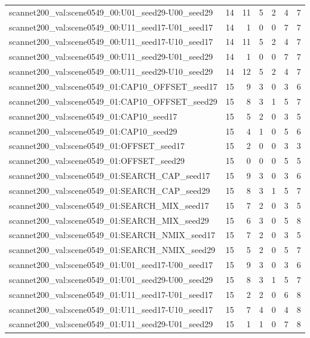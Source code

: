\begin{table}[t]
\begin{tabular}{lrrrrrr}
scannet200\_val:scene0549\_00:U01\_seed29-U00\_seed29 & 14 & 11 & 5 & 2 & 4 & 7 \\
scannet200\_val:scene0549\_00:U11\_seed17-U01\_seed17 & 14 & 1 & 0 & 0 & 7 & 7 \\
scannet200\_val:scene0549\_00:U11\_seed17-U10\_seed17 & 14 & 11 & 5 & 2 & 4 & 7 \\
scannet200\_val:scene0549\_00:U11\_seed29-U01\_seed29 & 14 & 1 & 0 & 0 & 7 & 7 \\
scannet200\_val:scene0549\_00:U11\_seed29-U10\_seed29 & 14 & 12 & 5 & 2 & 4 & 7 \\
scannet200\_val:scene0549\_01:CAP10\_OFFSET\_seed17 & 15 & 9 & 3 & 0 & 3 & 6 \\
scannet200\_val:scene0549\_01:CAP10\_OFFSET\_seed29 & 15 & 8 & 3 & 1 & 5 & 7 \\
scannet200\_val:scene0549\_01:CAP10\_seed17 & 15 & 5 & 2 & 0 & 3 & 5 \\
scannet200\_val:scene0549\_01:CAP10\_seed29 & 15 & 4 & 1 & 0 & 5 & 6 \\
scannet200\_val:scene0549\_01:OFFSET\_seed17 & 15 & 2 & 0 & 0 & 3 & 3 \\
scannet200\_val:scene0549\_01:OFFSET\_seed29 & 15 & 0 & 0 & 0 & 5 & 5 \\
scannet200\_val:scene0549\_01:SEARCH\_CAP\_seed17 & 15 & 9 & 3 & 0 & 3 & 6 \\
scannet200\_val:scene0549\_01:SEARCH\_CAP\_seed29 & 15 & 8 & 3 & 1 & 5 & 7 \\
scannet200\_val:scene0549\_01:SEARCH\_MIX\_seed17 & 15 & 7 & 2 & 0 & 3 & 5 \\
scannet200\_val:scene0549\_01:SEARCH\_MIX\_seed29 & 15 & 6 & 3 & 0 & 5 & 8 \\
scannet200\_val:scene0549\_01:SEARCH\_NMIX\_seed17 & 15 & 7 & 2 & 0 & 3 & 5 \\
scannet200\_val:scene0549\_01:SEARCH\_NMIX\_seed29 & 15 & 5 & 2 & 0 & 5 & 7 \\
scannet200\_val:scene0549\_01:U01\_seed17-U00\_seed17 & 15 & 9 & 3 & 0 & 3 & 6 \\
scannet200\_val:scene0549\_01:U01\_seed29-U00\_seed29 & 15 & 8 & 3 & 1 & 5 & 7 \\
scannet200\_val:scene0549\_01:U11\_seed17-U01\_seed17 & 15 & 2 & 2 & 0 & 6 & 8 \\
scannet200\_val:scene0549\_01:U11\_seed17-U10\_seed17 & 15 & 7 & 4 & 0 & 4 & 8 \\
scannet200\_val:scene0549\_01:U11\_seed29-U01\_seed29 & 15 & 1 & 1 & 0 & 7 & 8 \\

\end{tabular}
\end{table}
